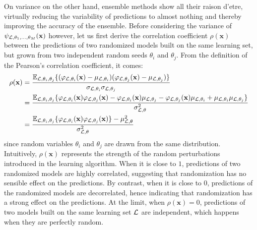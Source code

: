On variance on the other hand, ensemble methods show all their raison d'etre,
virtually reducing the variability of predictions to almost nothing and thereby
improving the accuracy of the ensemble. Before considering the variance of
$\psi_{{\cal L},\theta_1,\dots,\theta_M}(\mathbf{x})$ however, let us first
derive the correlation coefficient $\rho(\mathbf{x})$ between the predictions
of two randomized models built on the same learning set, but grown from two
independent random seeds $\theta_i$ and $\theta_j$. From the definition of the Pearson's correlation
coefficient, it comes:
\begin{align}
\rho(\mathbf{x}) &= \frac{\mathbb{E}_{{\cal L},\theta_i,\theta_j} \{ (\varphi_{{\cal L}, \theta_i}(\mathbf{x}) - \mu_{{\cal L},\theta_i}) (\varphi_{{\cal L}, \theta_j}(\mathbf{x}) - \mu_{{\cal L},\theta_j}) \}}{\sigma_{{\cal L},\theta_i} \sigma_{{\cal L},\theta_j}} \nonumber \\
&= \frac{\mathbb{E}_{{\cal L},\theta_i,\theta_j} \{ \varphi_{{\cal L},\theta_i}(\mathbf{x}) \varphi_{{\cal L},\theta_j}(\mathbf{x}) - \varphi_{{\cal L},\theta_i}(\mathbf{x}) \mu_{{\cal L},\theta_j} - \varphi_{{\cal L},\theta_j}(\mathbf{x}) \mu_{{\cal L},\theta_i} + \mu_{{\cal L},\theta_i} \mu_{{\cal L},\theta_j} \}}{\sigma^2_{{\cal L},\theta}} \nonumber \\
&= \frac{\mathbb{E}_{{\cal L},\theta_i,\theta_j} \{ \varphi_{{\cal L},\theta_i}(\mathbf{x}) \varphi_{{\cal L},\theta_j}(\mathbf{x}) \} - \mu^2_{{\cal L},\theta}}{\sigma^2_{{\cal L},\theta}} \label{eqn:4:correlation}
\end{align}
since random variables $\theta_i$ and $\theta_j$ are drawn from the same
distribution. Intuitively, $\rho(\mathbf{x})$ represents the strength of the
random perturbations introduced in the learning algorithm. When it is close to
$1$, predictions of two randomized models are highly correlated, suggesting
that randomization has no sensible effect on the predictions. By contrast, when
it is close to $0$, predictions of the randomized models are decorrelated,
hence indicating that randomization has a strong effect on the predictions. At
the limit, when $\rho(\mathbf{x})=0$, predictions of two models built on the
same learning set ${\cal L}$ are independent, which happens when they are
perfectly random.

